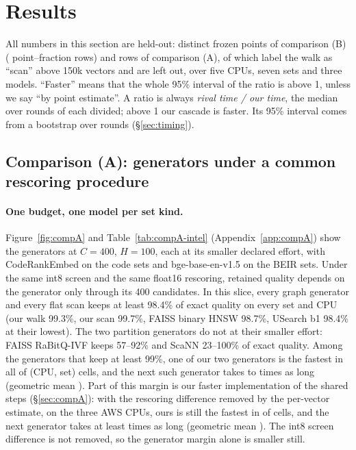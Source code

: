 \section{Results}\label{sec:results}

All numbers in this section are held-out:  distinct frozen points of comparison (B)
( point--fraction rows) and  rows of comparison (A), of which
 label the walk as ``scan'' above 150k vectors and are left out, over five CPUs, seven sets
and three models. ``Faster'' means that the whole 95\% interval of the ratio is above 1, unless we say
``by point estimate''. A ratio is always
\emph{rival time / our time}, the median over rounds of each divided; above 1 our cascade is faster.
Its 95\% interval comes from a bootstrap over rounds (\S\ref{sec:timing}).

\subsection{Comparison (A): generators under a common rescoring procedure}

\paragraph{One budget, one model per set kind.} Figure~\ref{fig:compA} and Table~\ref{tab:compA-intel} (Appendix~\ref{app:compA})
show the generators at $C = 400$, $H = 100$, each at its smaller declared effort, with CodeRankEmbed on
the code sets and bge-base-en-v1.5 on the BEIR sets. Under the same int8 screen and the same float16
rescoring, retained quality depends on the generator only through its 400 candidates. In this slice,
every graph generator and every flat scan keeps at least 98.4\% of exact quality on every set and CPU
(our walk 99.3\%, our scan 99.7\%, FAISS binary HNSW 98.7\%, USearch b1 98.4\% at their lowest). The
two partition generators do not at their smaller effort: FAISS RaBitQ-IVF keeps 57--92\% and ScaNN
23--100\% of exact quality. Among the generators that keep at least 99\%, one of our two generators is
the fastest in all  of  (CPU, set) cells, and the next such generator takes
 to  times as long (geometric mean ). Part of this margin is our faster
implementation of the shared steps (\S\ref{sec:compA}): with the rescoring difference removed by the
per-vector estimate, on the three AWS CPUs, ours is still the fastest in  of 
cells, and the next generator takes at least  times as long (geometric mean ).
The int8 screen difference is not removed, so the generator margin alone is smaller still.


